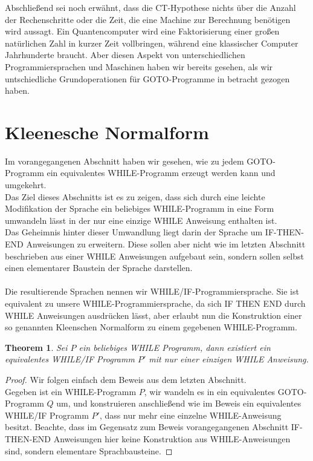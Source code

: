 \documentclass[11pt,a4paper,leqno]{report}
\newtheorem{theorem}{Theorem}[chapter]
\numberwithin{equation}{chapter}
\begin{document}
\noindent
Abschlie\ss{}end sei noch erw\"ahnt, dass die CT-Hypothese nichts \"uber die Anzahl der Rechenschritte oder die Zeit, die eine Machine zur Berechnung ben\"otigen wird aussagt. Ein Quantencomputer wird eine Faktorisierung einer gro\ss{}en nat\"urlichen Zahl in kurzer Zeit vollbringen, w\"ahrend eine klassischer Computer Jahrhunderte braucht. Aber diesen Aspekt von unterschiedlichen Programmiersprachen und Maschinen haben wir bereits gesehen, als wir untschiedliche Grundoperationen f\"ur GOTO-Programme in betracht gezogen haben.

\section{Kleenesche Normalform}
Im vorangegangenen Abschnitt haben wir gesehen, wie zu jedem GOTO-Programm ein equivalentes WHILE-Programm erzeugt werden kann und umgekehrt.\\
Das Ziel dieses Abschnitts ist es zu zeigen, dass  sich durch eine leichte Modifikation der Sprache ein beliebiges WHILE-Programm in eine Form umwandeln l\"asst in der nur eine einzige WHILE Anweisung enthalten ist.\\
Das Geheimnis hinter dieser Umwandlung liegt darin der Sprache um IF-THEN-END Anweisungen zu erweitern. Diese sollen aber nicht wie im letzten Abschnitt beschrieben aus einer WHILE Anweisungen aufgebaut sein, sondern sollen selbst einen elementarer Baustein der Sprache darstellen.\\
\\
Die resultierende Sprachen nennen wir WHILE/IF-Programmiersprache. Sie ist equivalent zu unsere WHILE-Programmiersprache, da sich IF THEN END durch WHILE Anweisungen ausdr\"ucken l\"asst, aber erlaubt nun die Konstruktion einer so genannten Kleenschen Normalform zu einem gegebenen WHILE-Programm.
\begin{theorem}
	Sei $P$ ein beliebiges WHILE Programm, dann existiert ein equivalentes WHILE/IF Programm $P'$ mit nur einer einzigen WHILE Anweisung.
\end{theorem}
\begin{proof}
Wir folgen einfach dem Beweis aus dem letzten Abschnitt.\\
Gegeben ist ein WHILE-Programm $P$, wir wandeln es in ein equivalentes GOTO-Programm $Q$ um, und konstruieren anschlie\ss{}end wie im Beweis ein equivalentes WHILE/IF Programm $P'$, dass nur mehr eine einzelne WHILE-Anweisung besitzt. Beachte, dass im Gegensatz zum Beweis vorangegangenen Abschnitt IF-THEN-END Anweisungen hier keine Konstruktion aus WHILE-Anweisungen sind, sondern elementare Sprachbausteine.
\end{proof}
\end{document}
